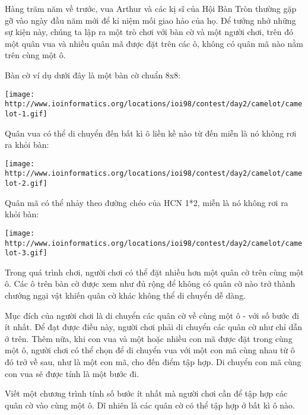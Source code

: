 Hàng trăm năm về trước, vua Arthur và các kị sĩ của Hội Bàn Tròn thường gặp gỡ vào ngày đầu năm mới để kỉ niệm mối giao hảo của họ. Để tưởng nhớ những sự kiện này, chúng ta lập ra một trò chơi với bàn cờ và một người chơi, trên đó một quân vua và nhiều quân mã được đặt trên các ô, không có quân mã nào nằm trên cùng một ô.

Bàn cờ ví dụ dưới đây là một bàn cờ chuẩn 8x8:


\texttt{[image: http://www.ioinformatics.org/locations/ioi98/contest/day2/camelot/camelot-1.gif]}

Quân vua có thể di chuyển đến bất kì ô liền kề nào từ đến miễn là nó không rơi ra khỏi bàn:


\texttt{[image: http://www.ioinformatics.org/locations/ioi98/contest/day2/camelot/camelot-2.gif]}

Quân mã có thể nhảy theo đường chéo của HCN 1*2, miễn là nó không rơi ra khỏi bàn:


\texttt{[image: http://www.ioinformatics.org/locations/ioi98/contest/day2/camelot/camelot-3.gif]}

Trong quá trình chơi, người chơi có thể đặt nhiều hơn một quân cờ trên cùng một ô. Các ô trên bàn cờ được xem như đủ rộng để không có quân cờ nào trở thành chướng ngại vật khiến quân cờ khác không thể di chuyển dễ dàng.

Mục đích của người chơi là di chuyển các quân cờ về cùng một ô - với số bước đi ít nhất. Để đạt được điều này, người chơi phải di chuyển các quân cờ như chỉ dẫn ở trên. Thêm nữa, khi con vua và một hoặc nhiều con mã được đặt trong cùng một ô, người chơi có thể chọn để di chuyển vua với một con mã cùng nhau từ ô đó trở về sau, như là một con mã, cho đến điểm tập hợp. Di chuyển con mã cùng con vua sẽ được tính là một bước đi.

Viết một chương trình tính số bước ít nhất mà người chơi cần để tập hợp các quân cờ vào cùng một ô. Dĩ nhiên là các quân cờ có thể tập hợp ở bất kì ô nào.
